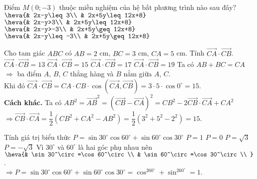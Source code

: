 \begin{ex}%
Điểm $M\left(0;-3\right)$ thuộc miền nghiệm của hệ bất phương trình nào sau đây?
\choice
{\True $\heva{& 2x-y\leq 3\\ & 2x+5y\leq 12x+8}$}
{$\heva{& 2x-y>3\\ & 2x+5y\leq 12x+8}$}
{$\heva{& 2x-y>-3\\ & 2x+5y\geq 12x+8}$}
{$\heva{& 2x-y\leq -3\\ & 2x+5y\geq 12x+8}$}

\end{ex}

\begin{ex}%
Cho tam giác $ABC$ có $AB=2$ cm, $BC=3$ cm, $CA=5$ cm. Tính $\overrightarrow{CA}\cdot\overrightarrow{CB}$.
\choice
{$\overrightarrow{CA}\cdot\overrightarrow{CB}=13$ }
{\True $\overrightarrow{CA}\cdot\overrightarrow{CB}=15$ }
{$\overrightarrow{CA}\cdot\overrightarrow{CB}=17$}
{$\overrightarrow{CA}\cdot\overrightarrow{CB}=19$ }
\loigiai
{Ta có $AB+BC=CA$$\Rightarrow $ ba điểm $A$, $B$, $C$ thẳng hàng và $B$ nằm giữa $A$, $C$.\\
Khi đó $\overrightarrow{CA}\cdot\overrightarrow{CB}=CA\cdot CB\cdot\cos (\overrightarrow{CA},\overrightarrow{CB} )=3\cdot5\cdot\cos 0^\circ=15$. \\
\textbf{Cách khác. }Ta có $AB^2=\overrightarrow{AB}^2=(\overrightarrow{CB}-\overrightarrow{CA} )^2=CB^2-2\overrightarrow{CB}\cdot\overrightarrow{CA}+CA^2$\\
$\Rightarrow\overrightarrow{CB}\cdot\overrightarrow{CA}=\dfrac{1}{2}(CB^2+CA^2-AB^2 )=\dfrac{1}{2}(3^2+5^2-2^2 )=15$.}
\end{ex}

\begin{ex}%
Tính giá trị biểu thức $P=\sin 30^\circ\cos 60^\circ+\sin 60^\circ\cos 30^\circ$
\choice
{\True $P=1$}
{$P=0$}
{$P=\sqrt{3}$}
{$P=-\sqrt{3}$}
\loigiai
{Vì $30^\circ$ và $60^\circ$ là hai góc phụ nhau nên $\heva{& \sin 30^\circ=\cos 60^\circ \\
& \sin 60^\circ=\cos 30^\circ \\
}$.\\
$\Rightarrow P=\sin 30^\circ\cos 60^\circ+\sin 60^\circ\cos 30^\circ=\cos^260^\circ+\sin ^260^\circ=1$.}
\end{ex}

